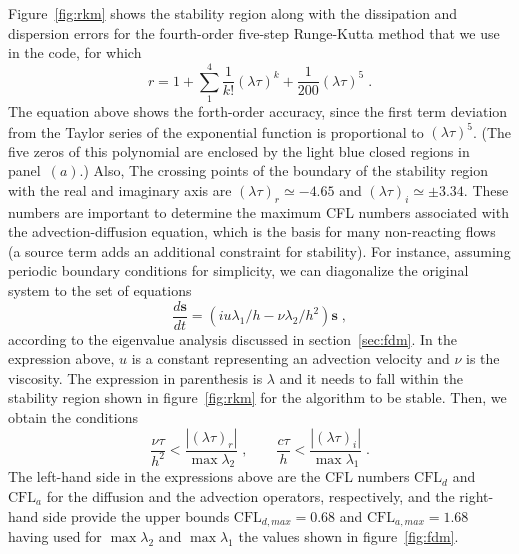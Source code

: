 {Figure~\ref{fig:rkm} shows the stability region along with the dissipation and
dispersion errors for the fourth-order five-step Runge-Kutta method that we use
in the code, for which
\begin{equation}
  r=1+\sum_1^4\frac{1}{k!}(\lambda \tau)^k+\frac{1}{200}(\lambda \tau)^5 \;.
\end{equation}
The equation above shows the forth-order accuracy, since the first term
deviation from the Taylor series of the exponential function is proportional to
$(\lambda\tau)^5$. (The five zeros of this polynomial are enclosed by the light
blue closed regions in panel~$(a)$.) Also, The crossing points of the boundary
of the stability region with the real and imaginary axis are $(\lambda
\tau)_{r}\simeq-4.65$ and $(\lambda \tau)_{i}\simeq\pm 3.34$. These numbers are
important to determine the maximum CFL numbers associated with the 
advection-diffusion equation, which is the basis for many non-reacting flows (a
source term adds an additional constraint for stability). For instance, assuming
periodic boundary conditions for simplicity, we can diagonalize the original
system to the set of equations
\begin{equation}
  \frac{d\mathbf{s}}{dt}=(iu\lambda_1/h -\nu\lambda_2/h^2)\mathbf{s} \;,
\end{equation}
according to the eigenvalue analysis discussed in section~\ref{sec:fdm}. In the
expression above, $u$ is a constant representing an advection velocity and $\nu$
is the viscosity.  The expression in parenthesis is $\lambda$ and it needs to
fall within the stability region shown in figure~\ref{fig:rkm} for the algorithm
to be stable. Then, we obtain the conditions
\begin{equation}
  \frac{\nu\tau}{h^2}<\frac{|(\lambda \tau)_{r}|}{\max{\lambda_2}}\;,\qquad
  \frac{c\tau}{h}<\frac{|(\lambda \tau)_{i}|}{\max{\lambda_1}} \;.
\end{equation}
The left-hand side in the expressions above are the CFL numbers $\textrm{CFL}_d$
and $\textrm{CFL}_a$ for the diffusion and the advection operators,
respectively, and the right-hand side provide the upper bounds
$\textrm{CFL}_{d,max}=0.68$ and $\textrm{CFL}_{a,max}=1.68$ having used for
$\max{\lambda_2}$ and $\max{\lambda_1}$ the values shown in
figure~\ref{fig:fdm}.

}

